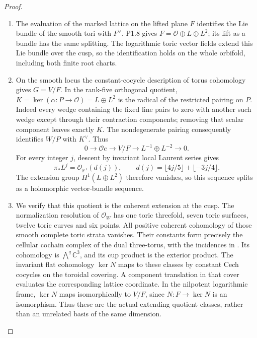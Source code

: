 \documentclass[11pt,a4paper]{article}
\theoremstyle{definition}
\begin{document}
\begin{proof}
\begin{enumerate}[label=\arabic*.]
\item The evaluation of the marked lattice on the lifted plane $F$
identifies the Lie bundle of the smooth tori with $F^\vee$.
P1.8 gives $F=\mathcal O\oplus L\oplus L^2$; its lift as a bundle
has the same splitting. The logarithmic toric vector fields extend
this Lie bundle over the cusp, so the identification holds on the
whole orbifold, including both finite root charts.

\item On the smooth locus the constant-cocycle description of torus
cohomology gives $G=V/F$. In the rank-five orthogonal quotient,
$K=\ker(\alpha:P\to\mathcal O)=L\oplus L^2$ is the radical of
the restricted pairing on $P$. Indeed every wedge containing the
fixed line pairs to zero with another such wedge except through
their contraction components; removing that scalar component
leaves exactly $K$. The nondegenerate pairing consequently
identifies $W/P$ with $K^\vee$. Thus
\[
 0\longrightarrow\mathcal O e\longrightarrow V/F
   \longrightarrow L^{-1}\oplus L^{-2}\longrightarrow0.
\]
For every integer $j$, descent by invariant local Laurent series gives
\begin{equation}\label{eq:P1Adegree}
 \pi_*L^j=\mathcal O_{\mathbb P^1}(d(j)),\qquad
 d(j)=\lfloor4j/5\rfloor+\lfloor-3j/4\rfloor.
\end{equation}
The extension group $H^1(L\oplus L^2)$ therefore vanishes, so this
sequence splits as a holomorphic vector-bundle sequence.

\item We verify that this quotient is the coherent extension at the cusp.
The normalization resolution of $\mathcal O_W$ has one toric
threefold, seven toric surfaces, twelve toric curves and six points.
All positive coherent cohomology of those smooth complete toric
strata vanishes. Their constants form precisely the cellular
cochain complex of the dual three-torus, with the incidences in
. Its cohomology is
$\bigwedge^q\mathbb C^3$, and its cup product is the exterior product.
The invariant flat cohomology $\ker N$ maps to these classes by
constant Cech cocycles on the toroidal covering. A component
translation in that cover evaluates the corresponding lattice
coordinate. In the nilpotent logarithmic frame, $\ker N$ maps
isomorphically to $V/F$, since $N:F\to\ker N$ is an isomorphism.
Thus these are the actual extending quotient classes, rather than
an unrelated basis of the same dimension.


\end{enumerate}
\end{proof}
\end{document}
